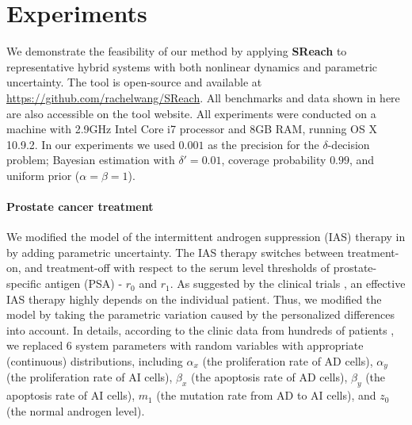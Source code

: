 \section{Experiments}

We demonstrate the feasibility of our method by applying {\bf SReach} to representative hybrid systems with both nonlinear dynamics and parametric uncertainty. 
The tool is open-source and available at \url{https://github.com/rachelwang/SReach}. 
All benchmarks and data shown in here are also accessible on the tool website. All experiments were conducted on a machine with 2.9GHz Intel Core i7 processor and 8GB RAM, running OS X 10.9.2. 
In our experiments we used $0.001$ as the precision for the $\delta$-decision problem; Bayesian estimation
with $\delta' = 0.01$, coverage probability $0.99$, and uniform prior ($\alpha = \beta = 1$). 


\paragraph{\bf Prostate cancer treatment}
We modified the model of the intermittent androgen suppression (IAS) therapy in \cite{tanaka2010mathematical} by adding parametric uncertainty. The IAS therapy switches between  treatment-on, and treatment-off with respect to the serum level thresholds of prostate-specific antigen (PSA) - $r_0$ and $r_1$. As suggested by the clinical trials \cite{bruchovsky2006final}, an effective IAS therapy highly depends on the individual patient. Thus, we modified the model by taking the parametric variation caused by the personalized differences into account. In details, according to the clinic data from hundreds of patients \cite{bruchovsky2007locally}, we replaced 6 system 
parameters with random variables with appropriate (continuous) distributions, including $\alpha_x$ (the proliferation rate of AD cells), $\alpha_y$ (the proliferation rate of AI cells), $\beta_x$ (the apoptosis rate of AD cells), $\beta_y$ (the apoptosis rate of AI cells), $m_1$ (the mutation rate from AD to AI cells), and $z_0$ (the normal androgen level).


